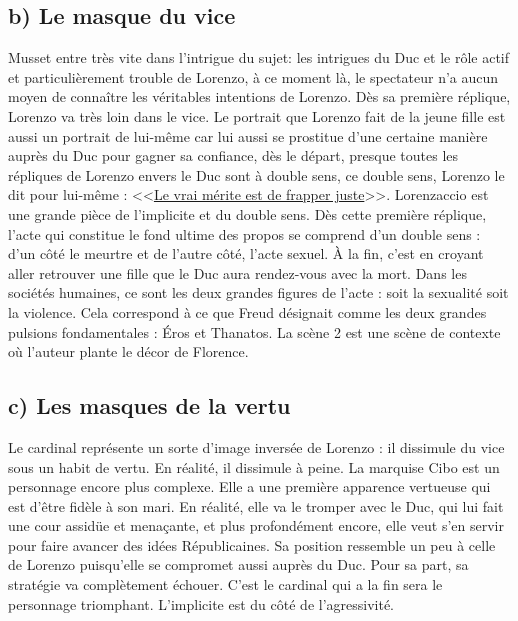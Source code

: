 \documentclass[12pt]{article}
\begin{document}
\subsection*{b) Le masque du vice}
Musset entre très vite dans l'intrigue du sujet: les intrigues du Duc et le rôle actif et particulièrement trouble de Lorenzo, à ce moment là, le spectateur n'a aucun moyen de connaître les véritables intentions de Lorenzo.
Dès sa première réplique, Lorenzo va très loin dans le vice.
Le portrait que Lorenzo fait de la jeune fille est aussi un portrait de lui-même car lui aussi se prostitue d'une certaine manière auprès du Duc pour gagner sa confiance, dès le départ, presque toutes les répliques de Lorenzo envers le Duc sont à double sens, ce double sens, Lorenzo le dit pour lui-même : <<\underline{Le vrai mérite est de frapper juste}>>.
Lorenzaccio est une grande pièce de l'implicite et du double sens.
Dès cette première réplique, l'acte qui constitue le fond ultime des propos se comprend d'un double sens : d'un côté le meurtre et de l'autre côté, l'acte sexuel.
À la fin, c'est en croyant aller retrouver une fille que le Duc aura rendez-vous avec la mort.
Dans les sociétés humaines, ce sont les deux grandes figures de l'acte : soit la sexualité soit la violence.
Cela correspond à ce que Freud désignait comme les deux grandes pulsions fondamentales : Éros et Thanatos.
La scène 2 est une scène de contexte où l'auteur plante le décor de Florence.
\subsection*{c) Les masques de la vertu}
Le cardinal représente un sorte d'image inversée de Lorenzo : il dissimule du vice sous un habit de vertu.
En réalité, il dissimule à peine.
La marquise Cibo est un personnage encore plus complexe.
Elle a une première apparence vertueuse qui est d'être fidèle à son mari.
En réalité, elle va le tromper avec le Duc, qui lui fait une cour assidüe et menaçante, et plus profondément encore, elle veut s'en servir pour faire avancer des idées Républicaines.
Sa position ressemble un peu à celle de Lorenzo puisqu'elle se compromet aussi auprès du Duc.
Pour sa part, sa stratégie va complètement échouer.
C'est le cardinal qui a la fin sera le personnage triomphant. 
L'implicite est du côté de l'agressivité.
\end{document}
